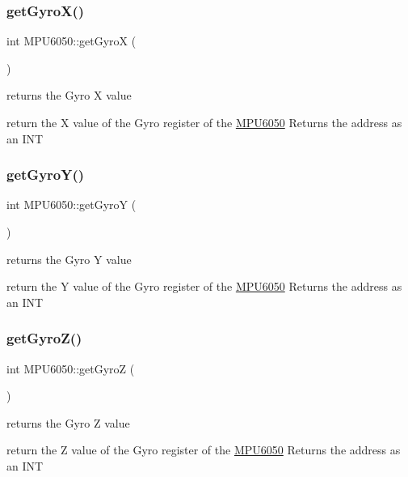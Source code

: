 \subsubsection{\texorpdfstring{get\+Gyro\+X()}{getGyroX()}}
{\footnotesize\ttfamily int M\+P\+U6050\+::get\+GyroX (\begin{DoxyParamCaption}{ }\end{DoxyParamCaption})}



returns the Gyro X value 

return the X value of the Gyro register of the \hyperlink{classMPU6050}{M\+P\+U6050} Returns the address as an I\+NT \mbox{\label{classMPU6050_a3b677f1d55c966978eeffa560839c3cd}} 
\subsubsection{\texorpdfstring{get\+Gyro\+Y()}{getGyroY()}}
{\footnotesize\ttfamily int M\+P\+U6050\+::get\+GyroY (\begin{DoxyParamCaption}{ }\end{DoxyParamCaption})}



returns the Gyro Y value 

return the Y value of the Gyro register of the \hyperlink{classMPU6050}{M\+P\+U6050} Returns the address as an I\+NT \mbox{\label{classMPU6050_ade58d79092bf5311984e39c4cdae2f7b}} 
\subsubsection{\texorpdfstring{get\+Gyro\+Z()}{getGyroZ()}}
{\footnotesize\ttfamily int M\+P\+U6050\+::get\+GyroZ (\begin{DoxyParamCaption}{ }\end{DoxyParamCaption})}



returns the Gyro Z value 

return the Z value of the Gyro register of the \hyperlink{classMPU6050}{M\+P\+U6050} Returns the address as an I\+NT \mbox{\label{classMPU6050_a56a203c7d63199222421ecf82716e992}} 
